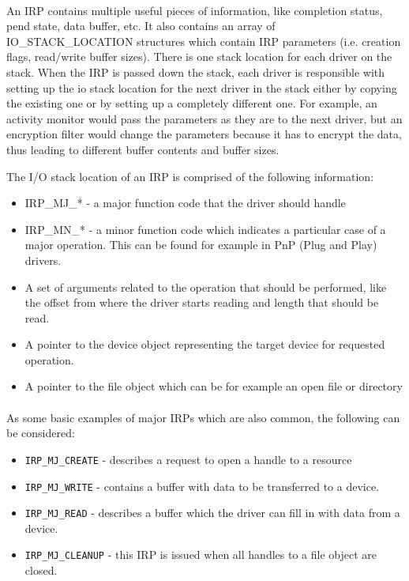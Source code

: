 		\paragraph{}
		An IRP contains multiple useful pieces of information, like completion status, pend state, data buffer, etc. It also contains an array of IO\_STACK\_LOCATION structures which contain IRP parameters (i.e. creation flags, read/write buffer sizes). There is one stack location for each driver on the stack. When the IRP is passed down the stack, each driver is responsible with setting up the io stack location for the next driver in the stack either by copying the existing one or by setting up a completely different one. For example, an activity monitor would pass the parameters as they are to the next driver, but an encryption filter would change the parameters because it has to encrypt the data, thus leading to different buffer contents and buffer sizes.
		
		
		The I/O stack location of an IRP is comprised of the following information: \cite{MSDNIOStackLocations}
		\begin{itemize}
			\item IRP\_MJ\_*  - a major function code that the driver should handle
			\item IRP\_MN\_*  - a minor function code which indicates a particular case of a major operation. This can be found for example in PnP (Plug and Play) drivers. 
			\item A set of arguments related to the operation that should be performed, like the offset from where the driver starts reading and length that should be read.
			\item A pointer to the device object representing the target device for requested operation.
			\item A pointer to the file object which can be for example an open file or directory
		\end{itemize}
		
		\paragraph{}
		As some basic examples of major IRPs which are also common, the following can be considered:		
		\begin{itemize}
			\item \texttt{IRP\_MJ\_CREATE} - describes a request to open a handle to a resource
			\item \texttt{IRP\_MJ\_WRITE} - contains a buffer with data to be transferred to a device.
			\item \texttt{IRP\_MJ\_READ} - describes a buffer which the driver can fill in with data from a device.
			\item \texttt{IRP\_MJ\_CLEANUP} - this IRP is issued when all handles to a file object are closed.
		\end{itemize}
	
